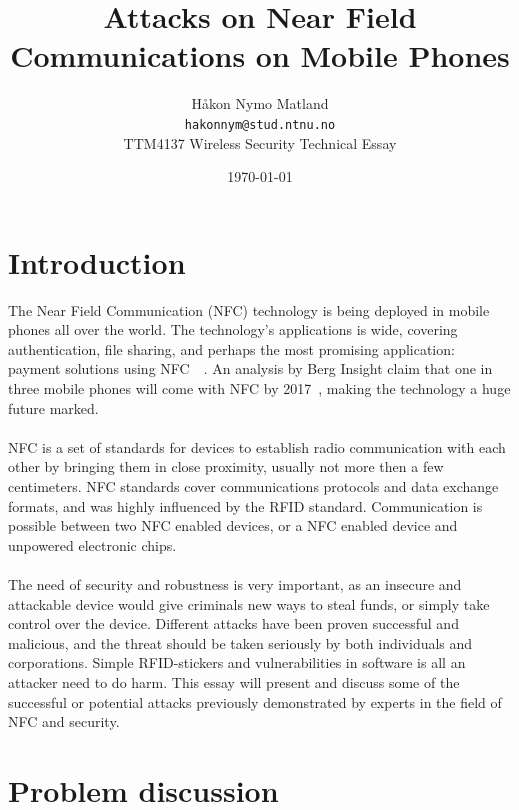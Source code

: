 \documentclass[a4paper,11pt]{article}
\title{Attacks on Near Field Communications on Mobile Phones}
\author{Håkon Nymo Matland \\
	\texttt{hakonnym@stud.ntnu.no}\\
	TTM4137 Wireless Security Technical Essay}
\date{\today}
\begin{document}
\maketitle


\section{Introduction}
The Near Field Communication (NFC) technology is being deployed in mobile phones all over the world. The technology's applications is wide, covering authentication, file sharing, and perhaps the most promising application: payment solutions using NFC~\cite{remedios2006nfc}~\cite{tan2013}. An analysis by Berg Insight claim that one in three mobile phones will come with NFC by 2017~\cite{nfc_growth}, making the technology a huge future marked.

\paragraph{}NFC is a set of standards for devices to establish radio communication with each other by bringing them in close proximity, usually not more then a few centimeters. NFC standards cover communications protocols and data exchange formats, and was highly influenced by the RFID standard. Communication is possible between two NFC enabled devices, or a NFC enabled device and unpowered electronic chips.


\paragraph{}The need of security and robustness is very important, as an insecure and attackable device would give criminals new ways to steal funds, or simply take control over the device. Different attacks have been proven successful and malicious, and the threat should be taken seriously by both individuals and corporations. Simple RFID-stickers and vulnerabilities in software is all an attacker need to do harm. This essay will present and discuss some of the successful or potential attacks previously demonstrated by experts in the field of NFC and security.


\section{Problem discussion}
\end{document}
